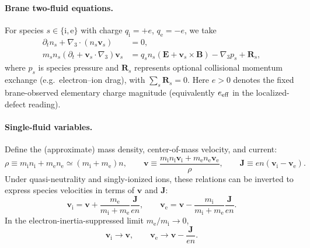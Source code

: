 \documentclass[11pt]{article}
\newcommand{\gradthree}{\nabla_3}
\newcommand{\ion}{\mathrm{i}}
\newcommand{\ele}{\mathrm{e}}
\newcommand{\E}{\mathbf{E}}
\newcommand{\B}{\mathbf{B}}
\newcommand{\Jb}{\mathbf{J}}
\newcommand{\rhob}{\rho}
\begin{document}
\paragraph{Brane two-fluid equations.}
For species \(s\in\{\ion,\ele\}\) with charge \(q_\ion=+e\), \(q_\ele=-e\), we take
\begin{align}
\partial_t n_s + \gradthree\cdot(n_s \mathbf{v}_s) &= 0,
\label{eq:twofluid_cont}
\\
m_s n_s\left(\partial_t + \mathbf{v}_s\cdot\gradthree\right)\mathbf{v}_s
&=
q_s n_s\left(\E + \mathbf{v}_s\times\B\right) - \gradthree p_s + \mathbf{R}_s,
\label{eq:twofluid_mom}
\end{align}
where \(p_s\) is species pressure and \(\mathbf{R}_s\) represents optional collisional
momentum exchange (e.g.\ electron--ion drag), with \(\sum_s \mathbf{R}_s=0\).
Here \(e>0\) denotes the fixed brane-observed elementary charge magnitude
(equivalently \(e_{\rm eff}\) in the localized-defect reading).

\paragraph{Single-fluid variables.}
Define the (approximate) mass density, center-of-mass velocity, and current:
\begin{equation}
\rhob \equiv m_\ion n_\ion + m_\ele n_\ele \simeq (m_\ion+m_\ele)n,
\qquad
\mathbf{v} \equiv \frac{m_\ion n_\ion \mathbf{v}_\ion + m_\ele n_\ele \mathbf{v}_\ele}{\rhob},
\qquad
\Jb \equiv e n(\mathbf{v}_\ion-\mathbf{v}_\ele).
\label{eq:mhd_defs}
\end{equation}
Under quasi-neutrality and singly-ionized ions, these relations can be inverted to
express species velocities in terms of $\mathbf{v}$ and $\Jb$:
\begin{equation}
\mathbf{v}_\ion
=
\mathbf{v} + \frac{m_\ele}{m_\ion+m_\ele}\frac{\Jb}{e n},
\qquad
\mathbf{v}_\ele
=
\mathbf{v} - \frac{m_\ion}{m_\ion+m_\ele}\frac{\Jb}{e n}.
\label{eq:vi_ve_exact}
\end{equation}
In the electron-inertia-suppressed limit \(m_\ele/m_\ion\to 0\),
\begin{equation}
\mathbf{v}_\ion \to \mathbf{v},
\qquad
\mathbf{v}_\ele \to \mathbf{v} - \frac{\Jb}{e n}.
\label{eq:vi_ve_me0}
\end{equation}
\end{document}
